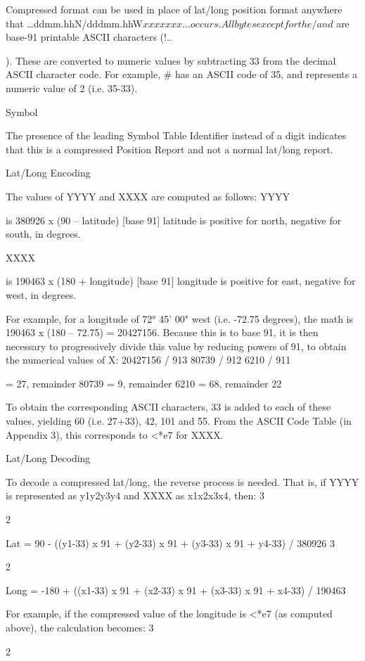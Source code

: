 Compressed format can be used in place of lat/long position format anywhere
that …ddmm.hhN/dddmm.hhW$xxxxxxx… occurs.
All bytes except for the / and $ are base-91 printable ASCII characters
(!..{). These are converted to numeric values by subtracting 33 from the
decimal ASCII character code. For example, # has an ASCII code of 35, and
represents a numeric value of 2 (i.e. 35-33).

Symbol

The presence of the leading Symbol Table Identifier instead of a digit
indicates that this is a compressed Position Report and not a normal lat/long
report.


Lat/Long Encoding

The values of YYYY and XXXX are computed as follows:
YYYY

is 380926 x (90 – latitude) [base 91]
latitude is positive for north, negative for south, in degrees.

XXXX

is 190463 x (180 + longitude) [base 91]
longitude is positive for east, negative for west, in degrees.

For example, for a longitude of 72° 45' 00" west (i.e. -72.75 degrees), the
math is 190463 x (180 – 72.75) = 20427156. Because this is to base 91, it is
then necessary to progressively divide this value by reducing powers of 91,
to obtain the numerical values of X:
20427156 / 913
80739 / 912
6210 / 911

= 27, remainder 80739
= 9, remainder 6210
= 68, remainder 22

To obtain the corresponding ASCII characters, 33 is added to each of these
values, yielding 60 (i.e. 27+33), 42, 101 and 55. From the ASCII Code Table
(in Appendix 3), this corresponds to <*e7 for XXXX.

Lat/Long Decoding

To decode a compressed lat/long, the reverse process is needed. That is, if
YYYY is represented as y1y2y3y4 and XXXX as x1x2x3x4, then:
3

2

Lat = 90 - ((y1-33) x 91 + (y2-33) x 91 + (y3-33) x 91 + y4-33) / 380926
3

2

Long = -180 + ((x1-33) x 91 + (x2-33) x 91 + (x3-33) x 91 + x4-33) / 190463

For example, if the compressed value of the longitude is <*e7 (as computed
above), the calculation becomes:
3

2

}
